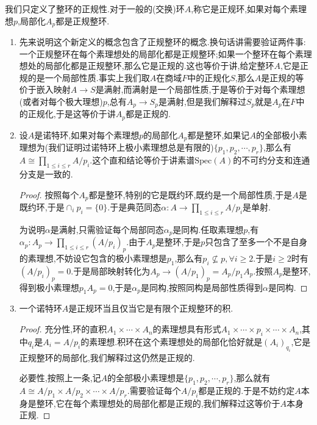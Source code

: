 我们只定义了整环的正规性.对于一般的(交换)环$A$,称它是正规环,如果对每个素理想$p$,局部化$A_p$都是正规整环.
\begin{enumerate}
	\item 先来说明这个新定义的概念包含了正规整环的概念.换句话讲需要验证两件事:一个正规整环在每个素理想处的局部化都是正规整环;如果一个整环在每个素理想处的局部化都是正规整环,那么它是正规的.这也等价于讲,给定整环$A$,它是正规的是一个局部性质.事实上我们取$A$在商域$F$中的正规化$S$,那么$A$是正规的等价于嵌入映射$A\to S$是满射,而满射是一个局部性质,于是等价于对每个素理想(或者对每个极大理想)$p$,总有$A_p\to S_p$是满射,但是我们解释过$S_p$就是$A_p$在$F$中的正规化,于是这等价于讲$A_p$都是正规的.
	\item 设$A$是诺特环,如果对每个素理想$p$的局部化$A_p$都是整环,如果记$A$的全部极小素理想为(我们证明过诺特环上极小素理想总是有限的)$\{p_1,p_2,\cdots,p_r\}$,那么有$A\cong\prod_{1\le i\le r}A/p_i$.这个直和结论等价于讲素谱$\mathrm{Spec}(A)$的不可约分支和连通分支是一致的.
	\begin{proof}
		
		按照每个$A_p$都是整环,特别的它是既约环,既约是一个局部性质,于是$A$是既约环,于是$\cap_ip_i=\{0\}$.于是典范同态$\alpha:A\to\prod_{1\le i\le r}A/p_i$是单射.
		
		为说明$\alpha$是满射,只需验证每个局部同态$\alpha_p$是同构.任取素理想$p$,有$\alpha_p:A_p\to\prod_{1\le i\le r}(A/p_i)_p$.由于$A_p$是整环,于是$p$只包含了至多一个不是自身的素理想,不妨设它包含的极小素理想是$p_1$,那么有$p_i\not\subseteq p,\forall i\ge2$.于是$i\ge2$时有$(A/p_i)_p=0$.于是局部映射转化为$A_p\to (A/p_1)_p=A_p/p_1A_p$.按照$A_p$是整环,得到极小素理想$p_1A_p=0$,于是$\alpha_p$是同构,按照同构是局部性质得到$\alpha$是同构.
	\end{proof}
	\item 一个诺特环$A$是正规环当且仅当它是有限个正规整环的积.
	\begin{proof}
		
		充分性,环的直积$A_1\times\cdots\times A_n$的素理想具有形式$A_1\times\cdots\times p_i\times\cdots\times A_n$,其中$q_i$是$A_i=A/p_i$的素理想.积环在这个素理想处的局部化恰好就是$(A_i)_{q_i}$,它是正规整环的局部化,我们解释过这仍然是正规的.
		
		必要性,按照上一条,记$A$的全部极小素理想是$\{p_1,p_2,\cdots,p_r\}$,那么就有$A\cong A/p_1\times A/p_2\times\cdots\times A/p_r$.需要验证每个$A/p_i$都是正规的.于是不妨约定$A$本身是整环,它在每个素理想处的局部化都是正规的,我们解释过这等价于$A$本身正规.    	
	\end{proof}
\end{enumerate}
